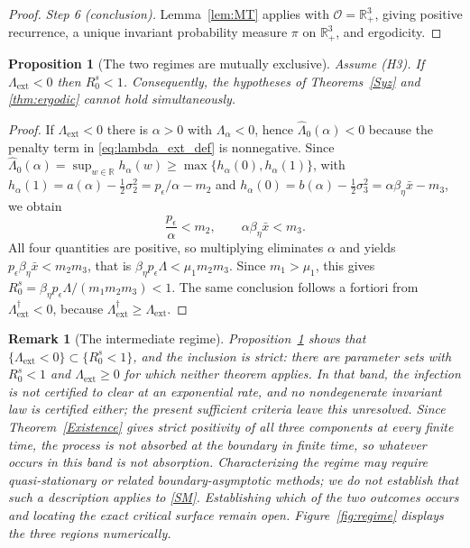 \documentclass{article}
\newtheorem{remark}{Remark}[section]
\newtheorem{proposition}{Proposition}[section]
\newcommand{\betaeta}{\beta_\eta}
\newcommand{\peps}{p_\epsilon}
\newcommand{\Rs}{R_0^{s}}
\newcommand{\Lext}{\Lambda_{\mathrm{ext}}}
\newcommand{\Lsharp}{\Lambda_{\mathrm{ext}}^{\dagger}}
\begin{document}
\begin{proof}
\emph{Step 6 (conclusion).} Lemma~\ref{lem:MT} applies with $\mathcal{O}=\mathbb{R}^3_+$, giving positive recurrence, a unique invariant probability measure $\pi$ on $\mathbb{R}^3_+$, and ergodicity.
\end{proof}

\begin{proposition}[The two regimes are mutually exclusive]\label{prop:dichotomy}
Assume (H3). If $\Lext<0$ then $\Rs<1$. Consequently, the hypotheses of Theorems~\ref{Syz} and \ref{thm:ergodic} cannot hold simultaneously.
\end{proposition}

\begin{proof}
If $\Lext<0$ there is $\alpha>0$ with $\Lambda_\alpha<0$, hence $\widehat\Lambda_0(\alpha)<0$ because the penalty term in \eqref{eq:lambda_ext_def} is nonnegative. Since $\widehat\Lambda_0(\alpha)=\sup_{w\in\mathbb{R}}h_\alpha(w)\ge\max\{h_\alpha(0),h_\alpha(1)\}$, with $h_\alpha(1)=a(\alpha)-\tfrac12\sigma_2^2=\peps/\alpha-m_2$ and $h_\alpha(0)=b(\alpha)-\tfrac12\sigma_3^2=\alpha\betaeta\bar x-m_3$, we obtain
\[
\frac{\peps}{\alpha}<m_2,\qquad \alpha\betaeta\bar x<m_3 .
\]
All four quantities are positive, so multiplying eliminates $\alpha$ and yields $\peps\betaeta\bar x<m_2m_3$, that is $\betaeta\peps\Lambda<\mu_1m_2m_3$. Since $m_1>\mu_1$, this gives $\Rs=\betaeta\peps\Lambda/(m_1m_2m_3)<1$. The same conclusion follows a fortiori from $\Lsharp<0$, because $\Lsharp\ge\Lext$.
\end{proof}

\begin{remark}[The intermediate regime]\label{rem:separation}
Proposition~\ref{prop:dichotomy} shows that $\{\Lext<0\}\subset\{\Rs<1\}$, and the inclusion is strict: there are parameter sets with $\Rs<1$ and $\Lext\ge0$ for which neither theorem applies. In that band, the infection is not certified to clear at an exponential rate, and no nondegenerate invariant law is certified either; the present sufficient criteria leave this unresolved. Since Theorem~\ref{Existence} gives strict positivity of all three components at every finite time, the process is not absorbed at the boundary in finite time, so whatever occurs in this band is not absorption. Characterizing the regime may require quasi-stationary or related boundary-asymptotic methods; we do not establish that such a description applies to \eqref{SM}. Establishing which of the two outcomes occurs and locating the exact critical surface remain open. Figure~\ref{fig:regime} displays the three regions numerically.
\end{remark}
\end{document}
